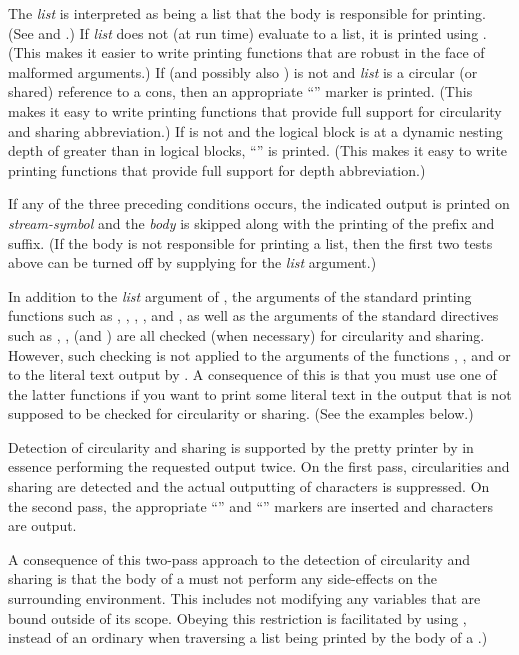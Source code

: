 \begin{defmac}
The {\it list} is interpreted as being a list that the body is responsible
for printing.  (See  and
.)  If {\it list} does not (at run time) evaluate to a list,
it is printed using .  (This makes it easier to write printing
functions that are robust in the face of malformed arguments.)  If
 (and possibly also )
is not  and {\it list} is a circular (or shared) reference
to a cons, then an appropriate ``'' marker is printed.
(This makes it easy to write printing functions that provide full support
for circularity and sharing abbreviation.)  If  is not
 and the logical block is at a dynamic nesting depth of greater
than  in logical blocks, ``\cd{\#}'' is printed.  (This
makes it easy to write printing functions that provide full support for depth
abbreviation.)

If any of the three preceding conditions occurs, the indicated output is
printed on {\it stream-symbol} and the {\it body} is skipped along with the
printing of the prefix and suffix.  (If the
body is not responsible for printing a list, then the first two tests
above can be turned off by supplying  for the {\it list} argument.)

In addition to the {\it list} argument of , the
arguments of the standard printing functions such as ,
, , , and , as well as the
arguments of the standard  directives such as ,
, (and ) are all checked (when necessary) for
circularity and sharing.  However, such checking is not applied to the
arguments of the functions , , and
 or to the literal text output by .  A
consequence of this is that you must use one of the latter functions if you
want to print some literal text in the output that is not supposed to be
checked for circularity or sharing.  (See the examples below.)

\beforenoterule
\begin{implementation}
Detection of circularity and sharing is supported by the pretty printer by
in essence performing the requested output twice.  On the first pass,
circularities and sharing are detected and the actual outputting of
characters is suppressed.  On the second pass, the appropriate 
``'' and ``'' markers are inserted and
characters are output.

A consequence of this two-pass approach to the detection of circularity and
sharing is that the body of a  must not
perform any side-effects on the surrounding environment.  This includes not
modifying any variables that are bound outside of its scope.  Obeying this
restriction is facilitated by using , instead of an ordinary
 when traversing a list being printed by the body of a
.)
\end{implementation}
\afternoterule
\end{defmac}

